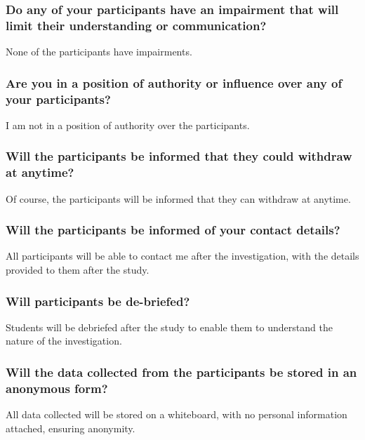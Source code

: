 \subsubsection{Do any of your participants have an impairment that will limit their understanding or communication?}
None of the participants have impairments.

\subsubsection{Are you in a position of authority or influence over any of your participants?}
I am not in a position of authority over the participants.

\subsubsection{Will the participants be informed that they could withdraw at anytime?}
Of course, the participants will be informed that they can withdraw at anytime.

\subsubsection{Will the participants be informed of your contact details?}
All participants will be able to contact me after the investigation, with the details provided to them after the study.

\subsubsection{Will participants be de-briefed?}
Students will be debriefed after the study to enable them to understand the nature of the investigation.

\subsubsection{Will the data collected from the participants be stored in an anonymous form?}
All data collected will be stored on a whiteboard, with no personal information attached, ensuring anonymity.
